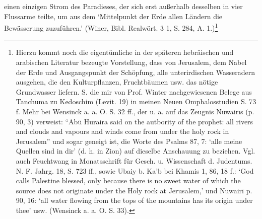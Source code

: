 \documentclass[a4paper, 11pt, oneside]{article}
\begin{document}
einen einzigen Strom des Paradieses, der sich erst außerhalb desselben in vier Flussarme teilte, um aus dem `Mittelpunkt der Erde allen Ländern die Bewässerung zuzuführen.' (Winer, Bibl. Realwört. 3 1, S. 284, A. 1.)\footnote{Hierzu kommt noch die eigentümliche in der späteren hebräischen und arabischen Literatur bezeugte Vorstellung, dass von Jerusalem, dem Nabel der Erde und Ausgangspunkt der Schöpfung, alle unterirdischen Wasseradern ausgehen, die den Kulturpflanzen, Fruchtbäumen usw. das nötige Grundwasser liefern. S. die mir von Prof. Winter nachgewiesenen Belege aus Tanchuma zu Kedoschim (Levit. 19) in meinen Neuen Omphalosstudien S. 73 f. Mehr bei Wensinck a. a. O. S. 32 ff., der u. a. auf das Zeugnis Nuwairīs (p. 90, 3) verweist: "`Abū Huraira said on the autbority of the prophet: all rivers and clouds and vapours and winds come from under the holy rock in Jerusalem"' und sogar geneigt ist, die Worte des Psalms 87, 7: `alle meine Quellen sind in dir' (d. h. in Zion) auf dieselbe Anschauung zu beziehen. Vgl. auch Feuchtwang in Monatsschrift für Gesch. u. Wissenschaft d. Judentums. N. F. Jahrg. 18, S. 723 ff., sowie Ubaiy b. Ka'b bei Khamis 1, 86, 18 f.: `God calls Palestine blessed, only because there is no sweet water of which the source does not originate under the Holy rock at Jerusalem,' und Nuwairī p. 90, 16: `all water flowing from the tops of the mountains has its origin under thee' usw. (Wensinck a. a. O. S. 33).}
\end{document}
